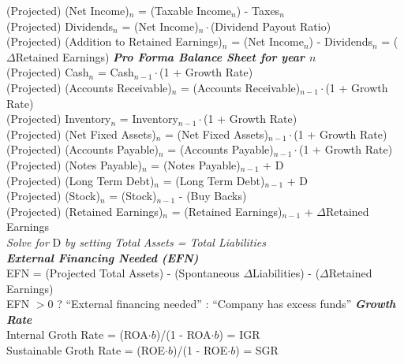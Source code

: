 \documentclass{letter}
\newcommand{\textib}[1]{\textit{\textbf{{#1}}}}
\begin{document}
(Projected) (Net Income)$_n$ = (Taxable Income$_n$) - Taxes$_n$ \\
(Projected) Dividends$_n$ = (Net Income)$_n \cdot$(Dividend Payout Ratio) \\
(Projected) (Addition to Retained Earnings)$_n$ = (Net Income$_n$) - Dividends$_n$ = ($\Delta$Retained Earnings)
\newline
\textib{Pro Forma Balance Sheet for year $n$} \\
(Projected) Cash$_n$ = Cash$_{n - 1} \cdot$(1 + Growth Rate) \\
(Projected) (Accounts Receivable)$_n$ = (Accounts Receivable)$_{n - 1} \cdot$(1 + Growth Rate) \\
(Projected) Inventory$_n$ = Inventory$_{n - 1} \cdot$(1 + Growth Rate) \\
(Projected) (Net Fixed Assets)$_n$ = (Net Fixed Assets)$_{n - 1} \cdot$(1 + Growth Rate) \\
(Projected) (Accounts Payable)$_n$ = (Accounts Payable)$_{n - 1} \cdot$(1 + Growth Rate) \\
(Projected) (Notes Payable)$_n$ = (Notes Payable)$_{n - 1}$ + D \\
(Projected) (Long Term Debt)$_n$ = (Long Term Debt)$_{n - 1}$ + D \\
(Projected) (Stock)$_n$ = (Stock)$_{n - 1}$ - (Buy Backs) \\
(Projected) (Retained Earnings)$_n$ = (Retained Earnings)$_{n - 1}$ + $\Delta$Retained Earnings \\
\textit{Solve for} D \textit{by setting Total Assets = Total Liabilities} \\
\textib{External Financing Needed (EFN)} \\
EFN = (Projected Total Assets) - (Spontaneous $\Delta$Liabilities) - ($\Delta$Retained Earnings) \\
EFN $> 0$ ? ``External financing needed'' : ``Company has excess funds''
\newline
\textib{Growth Rate} \\
Internal Groth Rate = (ROA$\cdot b$)/(1 - ROA$\cdot b$) = IGR \\
Sustainable Groth Rate = (ROE$\cdot b$)/(1 - ROE$\cdot b$) = SGR
\newline
\end{document}
